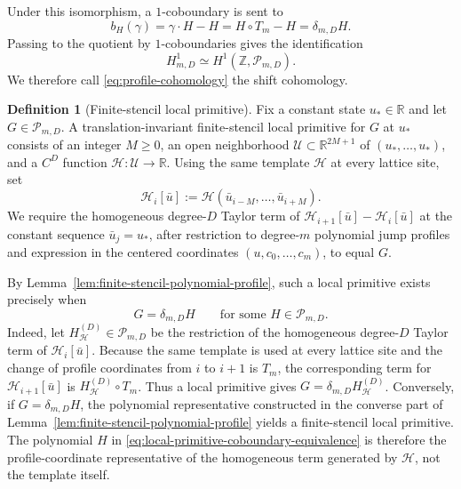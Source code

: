 \documentclass[11pt]{amsart}
\theoremstyle{plain}
\theoremstyle{definition}
\newtheorem{definition}[theorem]{Definition}
\theoremstyle{remark}
\numberwithin{equation}{section}
\theoremstyle{plain}
\begin{document}
Under this isomorphism, a $1$-coboundary is sent to
\[
	b_H(\gamma)=\gamma\cdot H-H
	=H\circ T_m-H
	=\delta_{m,D}H.
\]
Passing to the quotient by $1$-coboundaries gives the identification
\begin{equation}\label{eq:group-cohomology-identification}
	H^1_{m,D}\simeq H^1(\mathbb Z,\mathscr P_{m,D}).
\end{equation}
We therefore call \eqref{eq:profile-cohomology} the shift cohomology.


\begin{definition}[Finite-stencil local primitive]
	\label{def:local-primitive}
	Fix a constant state $u_*\in\mathbb R$ and let
	$G\in\mathscr P_{m,D}$.  A
	translation-invariant finite-stencil local primitive for $G$ at $u_*$
	consists of an integer $M\ge0$, an open neighborhood
	$\mathcal U\subset\mathbb R^{2M+1}$ of $(u_*,\ldots,u_*)$, and a $C^D$
	function $\mathcal H:\mathcal U\to\mathbb R$.  Using the same template
	$\mathcal H$ at every lattice site, set
	\[
	\mathcal H_i[\bar u]
	:=\mathcal H(\bar u_{i-M},\ldots,\bar u_{i+M}).
	\]
	We require the homogeneous degree-$D$ Taylor term of
	$\mathcal H_{i+1}[\bar u]-\mathcal H_i[\bar u]$ at the constant sequence
	$\bar u_j=u_*$, after restriction to degree-$m$ polynomial jump profiles
	and expression in the centered coordinates $(u,c_0,\ldots,c_m)$, to equal
	$G$.
\end{definition}

By Lemma~\ref{lem:finite-stencil-polynomial-profile}, such a local primitive
exists precisely when
\begin{equation}\label{eq:local-primitive-coboundary-equivalence}
	G=\delta_{m,D}H
	\qquad\text{for some }H\in\mathscr P_{m,D}.
\end{equation}
Indeed, let $H_{\mathcal H}^{(D)}\in\mathscr P_{m,D}$ be the restriction of
the homogeneous degree-$D$ Taylor term of $\mathcal H_i[\bar u]$.  Because
the same template is used at every lattice site and the change of profile
coordinates from $i$ to $i+1$ is $T_m$, the corresponding term for
$\mathcal H_{i+1}[\bar u]$ is $H_{\mathcal H}^{(D)}\circ T_m$.  Thus a local
primitive gives
$G=\delta_{m,D}H_{\mathcal H}^{(D)}$.  Conversely, if
$G=\delta_{m,D}H$, the polynomial representative constructed in the
converse part of Lemma~\ref{lem:finite-stencil-polynomial-profile} yields 
a finite-stencil local primitive.  The polynomial $H$ in
\eqref{eq:local-primitive-coboundary-equivalence} is therefore the
profile-coordinate representative of the homogeneous term generated by
$\mathcal H$, not the template itself.
\end{document}
